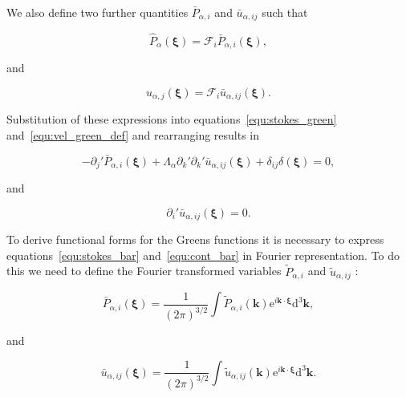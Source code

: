 \documentclass[12pt]{article}
\begin{document}
We also define two further quantities $\bar{P}_{\alpha, i}$ and $\bar{u}_{\alpha,ij}$ such that

\begin{equation}
\label{equ:pres_bar}
\hat{P}_{\alpha} (\boldsymbol{\xi}) = \mathcal{F}_{i} \bar{P}_{\alpha, i} (\boldsymbol{\xi}) ,
\end{equation}

and 

\begin{equation}
\label{equ:vel_bar}
\hat{u}_{\alpha,j}(\boldsymbol{\xi}) = \mathcal{F}_{i} \bar{u}_{\alpha,ij} (\boldsymbol{\xi}) .
\end{equation}

Substitution of these expressions into equations~\ref{equ:stokes_green} and~\ref{equ:vel_green_def} and rearranging results in

\begin{equation}
\label{equ:stokes_bar}
-\partial_{j}' \bar{P}_{\alpha, i} (\boldsymbol\xi) + \Lambda_{\alpha} \partial_{k}' \partial_{k}' \bar{u}_{\alpha,ij} (\boldsymbol\xi) + \delta_{ij} \delta(\boldsymbol\xi) = 0 ,
\end{equation}

and

\begin{equation}
\label{equ:cont_bar}
\partial_{i}' \bar{u}_{\alpha,ij} (\boldsymbol\xi)  = 0 .
\end{equation}


To derive functional forms for the Greens functions it is necessary to express equations~\ref{equ:stokes_bar} and~\ref{equ:cont_bar} in Fourier representation. To do this we need to define the Fourier transformed variables $\tilde{P}_{\alpha, i}$ and $\tilde{u}_{\alpha,ij}$ \cite{Riley06}:

\begin{equation}
\label{equ:fourier_p}
\bar{P}_{\alpha, i} (\boldsymbol\xi) = \frac{1}{(2 \pi)^{3/2}} \int \tilde{P}_{\alpha, i} (\boldsymbol{k}) \mathrm{e}^{i \boldsymbol{k} \cdot \boldsymbol\xi} \mathrm{d}^{3} \boldsymbol{k} ,
\end{equation}

and 

\begin{equation}
\label{equ:fourier_vel}
\bar{u}_{\alpha,ij} (\boldsymbol\xi) = \frac{1}{(2 \pi)^{3/2}} \int \tilde{u}_{\alpha,ij} (\boldsymbol{k}) \mathrm{e}^{i \boldsymbol{k} \cdot \boldsymbol\xi} \mathrm{d}^{3} \boldsymbol{k} .
\end{equation}
\end{document}
